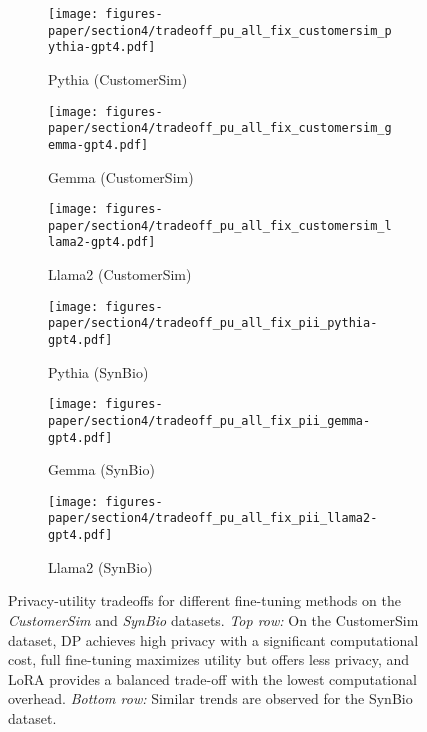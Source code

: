 \begin{figure*}[t]
    \centering
    \begin{subfigure}{0.3\textwidth}
        \centering
        \texttt{[image: figures-paper/section4/tradeoff\_pu\_all\_fix\_customersim\_pythia-gpt4.pdf]}
        \caption{Pythia (CustomerSim)}
        \label{fig:fdl_csim1}
    \end{subfigure}
    \begin{subfigure}{0.3\textwidth}
        \centering
        \texttt{[image: figures-paper/section4/tradeoff\_pu\_all\_fix\_customersim\_gemma-gpt4.pdf]}
        \caption{Gemma (CustomerSim)}
        \label{fig:fdl_csim2}
    \end{subfigure}
    \begin{subfigure}{0.3\textwidth}
        \centering
        \texttt{[image: figures-paper/section4/tradeoff\_pu\_all\_fix\_customersim\_llama2-gpt4.pdf]}
        \caption{Llama2 (CustomerSim)}
        \label{fig:fdl_csim3}
    \end{subfigure}

    \begin{subfigure}{0.3\textwidth}
        \centering
        \texttt{[image: figures-paper/section4/tradeoff\_pu\_all\_fix\_pii\_pythia-gpt4.pdf]}
        \caption{Pythia (SynBio)}
        \label{fig:fdl_pii1}
    \end{subfigure}
    \begin{subfigure}{0.3\textwidth}
        \centering
        \texttt{[image: figures-paper/section4/tradeoff\_pu\_all\_fix\_pii\_gemma-gpt4.pdf]}
        \caption{Gemma (SynBio)}
        \label{fig:fdl_pii2}
    \end{subfigure}
    \begin{subfigure}{0.3\textwidth}
        \centering
        \texttt{[image: figures-paper/section4/tradeoff\_pu\_all\_fix\_pii\_llama2-gpt4.pdf]}
        \caption{Llama2 (SynBio)}
        \label{fig:fdl_pii3}
    \end{subfigure}

    \caption{
        Privacy-utility tradeoffs for different fine-tuning methods on the \emph{CustomerSim} and \emph{SynBio} datasets. \emph{Top row:} On the CustomerSim dataset, DP achieves high privacy with a significant computational cost, full fine-tuning maximizes utility but offers less privacy, and LoRA provides a balanced trade-off with the lowest computational overhead. \emph{Bottom row:} Similar trends are observed for the SynBio dataset.
    }
    \label{fig:combined_fdl}
\end{figure*}

